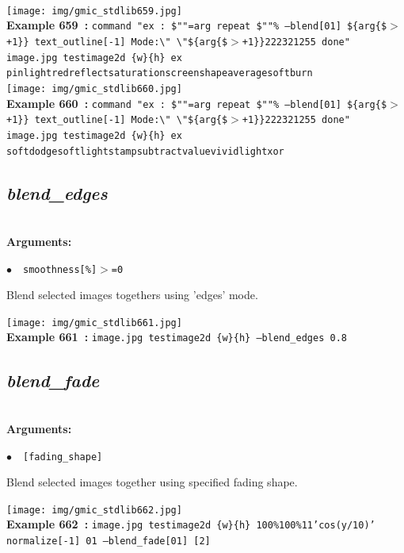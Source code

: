 \documentclass[a4paper,10.5pt,twoside]{book}
\def\comma{\discretionary{,}{}{,}}
\newcommand{\Cb}[1]{\textcolor{cb}{#1}}
\begin{document}
\begin{center}
\\\texttt{[image: img/gmic\_stdlib659.jpg]}\\
{\footnotesize \textbf{Example 659~:} \texttt{command "ex : \$""=arg repeat \$""\% --blend[0{\comma}1] \$\{arg\{\$$>$+1\}\} text\_outline[-1] Mode:\textbackslash " \textbackslash "\$\{arg\{\$$>$+1\}\}{\comma}2{\comma}2{\comma}23{\comma}2{\comma}1{\comma}255 done" image.jpg testimage2d \{w\}{\comma}\{h\} ex pinlight{\comma}red{\comma}reflect{\comma}saturation{\comma}screen{\comma}shapeaverage{\comma}softburn}}
\\\texttt{[image: img/gmic\_stdlib660.jpg]}\\
{\footnotesize \textbf{Example 660~:} \texttt{command "ex : \$""=arg repeat \$""\% --blend[0{\comma}1] \$\{arg\{\$$>$+1\}\} text\_outline[-1] Mode:\textbackslash " \textbackslash "\$\{arg\{\$$>$+1\}\}{\comma}2{\comma}2{\comma}23{\comma}2{\comma}1{\comma}255 done" image.jpg testimage2d \{w\}{\comma}\{h\} ex softdodge{\comma}softlight{\comma}stamp{\comma}subtract{\comma}value{\comma}vividlight{\comma}xor}}
\end{center}

\subsection{\emph{blend\_edges} }\vspace*{-0.7em}
~\\\textbf{\Cb{Arguments: }}\begin{flushleft}
{\small \Cb{\hspace*{0.5cm}$\bullet$~~\texttt{smoothness[\%]$>$=0}}}\end{flushleft}
Blend selected images togethers using 'edges' mode.
\begin{center}\texttt{[image: img/gmic\_stdlib661.jpg]}\\
{\footnotesize \textbf{Example 661~:} \texttt{image.jpg testimage2d \{w\}{\comma}\{h\} --blend\_edges 0.8}}
\end{center}

\subsection{\emph{blend\_fade} }\vspace*{-0.7em}
~\\\textbf{\Cb{Arguments: }}\begin{flushleft}
{\small \Cb{\hspace*{0.5cm}$\bullet$~~\texttt{[fading\_shape]}}}\end{flushleft}
Blend selected images together using specified fading shape.
\begin{center}\texttt{[image: img/gmic\_stdlib662.jpg]}\\
{\footnotesize \textbf{Example 662~:} \texttt{image.jpg testimage2d \{w\}{\comma}\{h\} 100\%{\comma}100\%{\comma}1{\comma}1{\comma}'cos(y/10)' normalize[-1] 0{\comma}1 --blend\_fade[0{\comma}1] [2]}}
\end{center}
\end{document}
